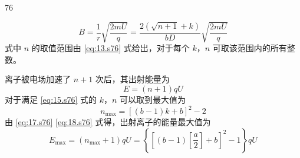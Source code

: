 \begin{solution}{76}
\begin{subsolution}
        \begin{equation}
            B = \frac{1}{r} \sqrt{\frac{2 m U}{q}} = \frac{2 (\sqrt{n + 1} + k)}{b D} \sqrt{\frac{2 m U}{q}}
            \label{eq:16.s76}
        \end{equation}
        式中 $n$ 的取值范围由 \eqref{eq:13.s76} 式给出，对于每个 $k$，$n$ 可取该范围内的所有整数。
    \end{subsolution}
    \begin{subsolution}
        离子被电场加速了 $n+1$ 次后，其出射能量为
        \begin{equation}
            E = (n + 1) q U
            \label{eq:17.s76}
        \end{equation}
        对于满足 \eqref{eq:15.s76} 式的 $k$，$n$ 可以取到最大值为
        \begin{equation}
            n_{\max} = [ (b - 1) k + b ]^{2} - 2
            \label{eq:18.s76}
        \end{equation}
        由 \eqref{eq:17.s76} \eqref{eq:18.s76} 式得，出射离子的能量最大值为
        \begin{equation}
            E_{\max} = (n_{\max} + 1) q U = \left\{ \left[ (b - 1) \left[ \frac{a}{2} \right] + b \right]^{2} - 1 \right\} q U
            \label{eq:19.s76}
        \end{equation}
    \end{subsolution}
\end{solution}